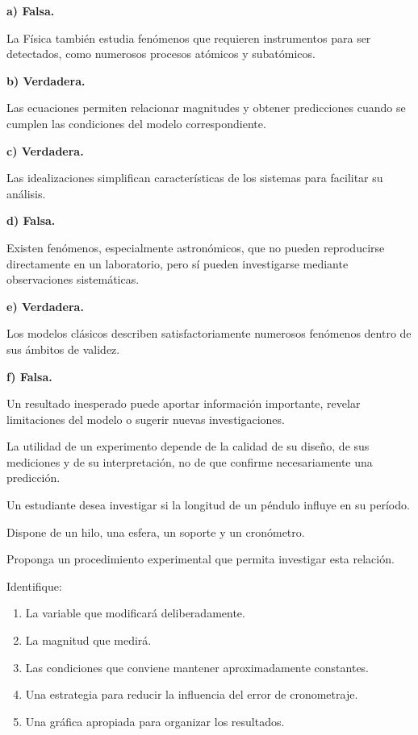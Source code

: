 \begin{explicacion}
\textbf{a) Falsa.}

La Física también estudia fenómenos que requieren instrumentos para ser detectados, como numerosos procesos atómicos y subatómicos.

\textbf{b) Verdadera.}

Las ecuaciones permiten relacionar magnitudes y obtener predicciones cuando se cumplen las condiciones del modelo correspondiente.

\textbf{c) Verdadera.}

Las idealizaciones simplifican características de los sistemas para facilitar su análisis.

\textbf{d) Falsa.}

Existen fenómenos, especialmente astronómicos, que no pueden reproducirse directamente en un laboratorio, pero sí pueden investigarse mediante observaciones sistemáticas.

\textbf{e) Verdadera.}

Los modelos clásicos describen satisfactoriamente numerosos fenómenos dentro de sus ámbitos de validez.

\textbf{f) Falsa.}

Un resultado inesperado puede aportar información importante, revelar limitaciones del modelo o sugerir nuevas investigaciones.

La utilidad de un experimento depende de la calidad de su diseño, de sus mediciones y de su interpretación, no de que confirme necesariamente una predicción.
\end{explicacion}


\nivelintermedio

\begin{ejercicio}
Un estudiante desea investigar si la longitud de un péndulo influye en su período.

Dispone de un hilo, una esfera, un soporte y un cronómetro.

Proponga un procedimiento experimental que permita investigar esta relación.

Identifique:

\begin{enumerate}[label=\alph*)]
    \item La variable que modificará deliberadamente.
    \item La magnitud que medirá.
    \item Las condiciones que conviene mantener aproximadamente constantes.
    \item Una estrategia para reducir la influencia del error de cronometraje.
    \item Una gráfica apropiada para organizar los resultados.
\end{enumerate}
\end{ejercicio}

